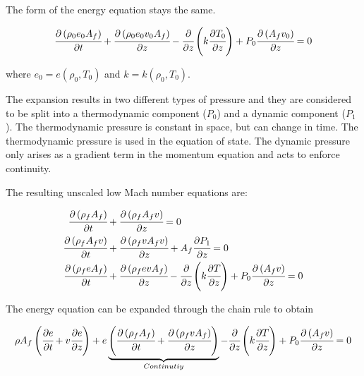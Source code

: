 \documentclass[../Article_Model_Parameters.tex]{subfiles}
\begin{document}
	The form of the energy equation stays the same. 
	
	{\footnotesize
		\begin{equation*}
			\cfrac{\partial \left( \rho_0 e_0 A_f \right) }{\partial t} + \cfrac{\partial \left( \rho_0 e_0 v_0 A_f \right)}{\partial z} - \cfrac{\partial}{\partial z} \left( k \cfrac{\partial T_0}{\partial z} \right) + P_0 \cfrac{\partial \left(A_f v_0\right)}{\partial z} = 0
		\end{equation*}
	}
	
	where $e_0 = e(\rho_0, T_0)$ and $k=k(\rho_0, T_0)$.
	
	The expansion results in two different types of pressure and they are considered to be split into a thermodynamic component ($P_0$) and a dynamic component ($P_1$). The thermodynamic pressure is constant in space, but can change in time. The thermodynamic pressure is used in the equation of state. The dynamic pressure only arises as a gradient term in the momentum equation and acts to enforce continuity.
	
	The resulting unscaled low Mach number equations are:
	
	{\footnotesize
		\begin{align*}
			\cfrac{\partial \left( \rho_f A_f \right)}{\partial t} &+ \cfrac{\partial \left( \rho_f A_f v \right)}{\partial z} = 0 \\
			\cfrac{\partial \left( \rho_f A_f v \right) }{\partial t}	&+ \cfrac{\partial \left( \rho_f v A_f v \right)}{\partial z} + A_f \cfrac{\partial P_1}{\partial z} = 0\\
			\cfrac{\partial \left( \rho_f e A_f \right) }{\partial t} &+ \cfrac{\partial \left( \rho_f e v A_f \right)}{\partial z} - \cfrac{\partial}{\partial z} \left( k \cfrac{\partial T}{\partial z} \right) + P_0 \cfrac{\partial \left(A_f v\right)}{\partial z} = 0
		\end{align*}
	}
	
	The energy equation can be expanded through the chain rule to obtain
	
	{\footnotesize
		\begin{equation*}
			\rho A_f \left( \cfrac{\partial e }{\partial t} + v \cfrac{\partial e}{\partial z} \right) + e  \underbrace{ \left( \cfrac{\partial \left( \rho_f A_f \right) }{\partial t} + \cfrac{\partial \left( \rho_f v A_f \right)}{\partial z} \right) }_{Continutiy}  - \cfrac{\partial}{\partial z} \left( k \cfrac{\partial T}{\partial z} \right) + P_0 \cfrac{\partial \left(A_f v\right)}{\partial z} = 0
		\end{equation*}
	}
	
\end{document}
